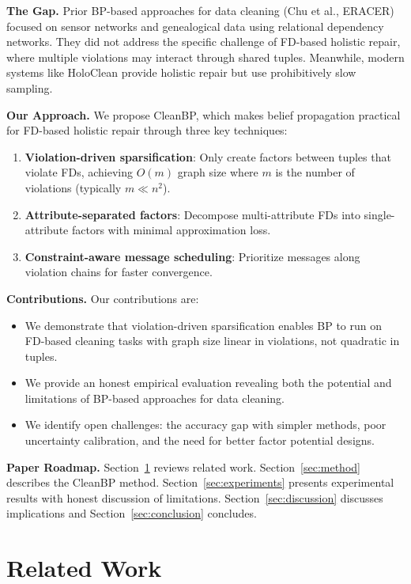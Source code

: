 \documentclass{article}
\begin{document}
\textbf{The Gap.} Prior BP-based approaches for data cleaning (Chu et al., ERACER) focused on sensor networks and genealogical data using relational dependency networks. They did not address the specific challenge of FD-based holistic repair, where multiple violations may interact through shared tuples. Meanwhile, modern systems like HoloClean provide holistic repair but use prohibitively slow sampling.

\textbf{Our Approach.} We propose CleanBP, which makes belief propagation practical for FD-based holistic repair through three key techniques:
\begin{enumerate}
    \item \textbf{Violation-driven sparsification}: Only create factors between tuples that violate FDs, achieving $O(m)$ graph size where $m$ is the number of violations (typically $m \ll n^2$).
    \item \textbf{Attribute-separated factors}: Decompose multi-attribute FDs into single-attribute factors with minimal approximation loss.
    \item \textbf{Constraint-aware message scheduling}: Prioritize messages along violation chains for faster convergence.
\end{enumerate}

\textbf{Contributions.} Our contributions are:
\begin{itemize}
    \item We demonstrate that violation-driven sparsification enables BP to run on FD-based cleaning tasks with graph size linear in violations, not quadratic in tuples.
    \item We provide an honest empirical evaluation revealing both the potential and limitations of BP-based approaches for data cleaning.
    \item We identify open challenges: the accuracy gap with simpler methods, poor uncertainty calibration, and the need for better factor potential designs.
\end{itemize}

\textbf{Paper Roadmap.} Section~\ref{sec:related} reviews related work. Section~\ref{sec:method} describes the CleanBP method. Section~\ref{sec:experiments} presents experimental results with honest discussion of limitations. Section~\ref{sec:discussion} discusses implications and Section~\ref{sec:conclusion} concludes.

\section{Related Work}
\label{sec:related}
\end{document}
